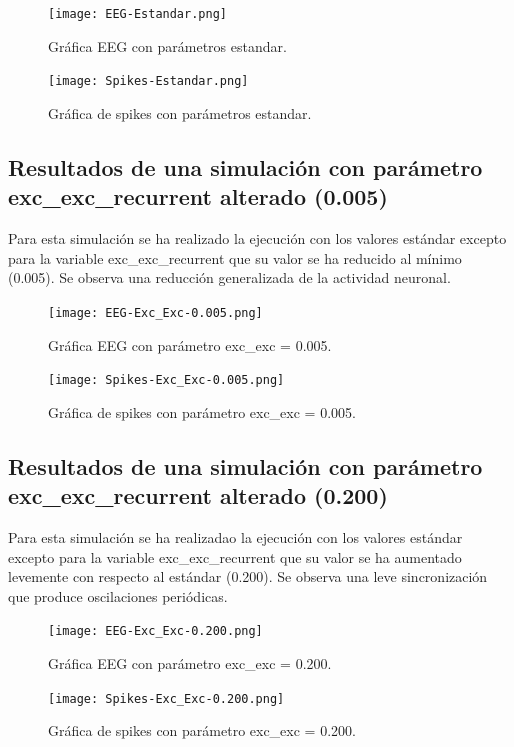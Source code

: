 \documentclass[oneside,openright,titlepage,numbers=noenddot,openany,headinclude,footinclude=true,
cleardoublepage=empty,abstractoff,BCOR=5mm,paper=a4,fontsize=12pt,main=spanish]{scrreprt}
\begin{document}
\begin{figure}[htb]
	\centering
	\texttt{[image: EEG-Estandar.png]}
	\caption{Gráfica EEG con parámetros estandar.}
\end{figure}

\begin{figure}[htb]
	\centering
	\texttt{[image: Spikes-Estandar.png]}
	\caption{Gráfica de spikes con parámetros estandar.}
\end{figure}

\newpage
\subsection{Resultados de una simulación con parámetro exc\_exc\_recurrent alterado (0.005)}

Para esta simulación se ha realizado la ejecución con los valores estándar excepto para la variable exc\_exc\_recurrent que su valor se ha reducido al mínimo (0.005). Se observa una reducción generalizada de la actividad neuronal.

\begin{figure}[htb]
	\centering
	\texttt{[image: EEG-Exc\_Exc-0.005.png]}
	\caption{Gráfica EEG con parámetro exc\_exc = 0.005.}
\end{figure}

\begin{figure}[htb]
	\centering
	\texttt{[image: Spikes-Exc\_Exc-0.005.png]}
	\caption{Gráfica de spikes con parámetro exc\_exc = 0.005.}
\end{figure}

\newpage
\subsection{Resultados de una simulación con parámetro exc\_exc\_recurrent alterado (0.200)}

Para esta simulación se ha realizadao la ejecución con los valores estándar excepto para la variable exc\_exc\_recurrent que su valor se ha aumentado levemente con respecto al estándar (0.200). Se observa una leve sincronización que produce oscilaciones periódicas.

\begin{figure}[htb]
	\centering
	\texttt{[image: EEG-Exc\_Exc-0.200.png]}
	\caption{Gráfica EEG con parámetro exc\_exc = 0.200.}
\end{figure}

\begin{figure}[htb]
	\centering
	\texttt{[image: Spikes-Exc\_Exc-0.200.png]}
	\caption{Gráfica de spikes con parámetro exc\_exc = 0.200.}
\end{figure}
\end{document}
